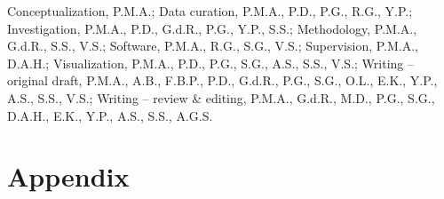\documentclass[journal=jpclcd,manuscript=article]{achemso}
\newcommand{\pbox}[1]{{
\fbox{
\parbox{0.8\textwidth}{  \fbox{$\triangleright$\textcolor{blue}{\textbf{Peter}:}} 
#1
}}}}
\begin{document}

Conceptualization, P.M.A.;
Data curation, P.M.A., P.D., P.G., R.G., Y.P.;
Investigation, P.M.A., P.D., G.d.R., P.G., Y.P., S.S.;
Methodology, P.M.A., G.d.R., S.S., V.S.;
Software, P.M.A., R.G., S.G., V.S.;
Supervision, P.M.A., D.A.H.;
Visualization, P.M.A., P.D., P.G., S.G., A.S., S.S., V.S.; 
Writing – original draft, P.M.A., A.B., F.B.P., P.D., G.d.R., P.G., S.G., O.L., E.K., Y.P., A.S., S.S., V.S.; 
Writing – review \& editing, P.M.A., G.d.R., M.D., P.G., S.G., D.A.H., E.K., Y.P., A.S., S.S., A.G.S.

\newpage
% 


\appendix

\newpage
\section{Appendix}


\end{document}
